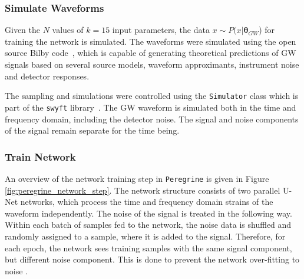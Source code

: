 \subsubsection{Simulate Waveforms}
\label{sec:method_peregine_simulate}
Given the $N$ values of $k=15$ input parameters, the data $x \sim P(x|\boldsymbol{\theta}_{GW}$) for training the network is simulated. The waveforms were simulated using the open source Bilby code~\cite{Ashton_Bilby_2019}, which is capable of generating theoretical predictions of GW signals based on several source models, waveform approximants, instrument noise and detector responses.

The sampling and simulations were controlled using the \texttt{Simulator} class which is part of the \texttt{swyft} library~\cite{Miller2022}. The GW waveform is simulated both in the time and frequency domain, including the detector noise. The signal and noise components of the signal remain separate for the time being.

\subsubsection{Train Network}

An overview of the network training step in \texttt{Peregrine} is given in Figure \ref{fig:peregrine_network_step}. The network structure consists of two parallel U-Net networks, which process the time and frequency domain strains of the waveform independently. The noise of the signal is treated in the following way. Within each batch of samples fed to the network, the noise data is shuffled and randomly assigned to a sample, where it is added to the signal. Therefore, for each epoch, the network sees training samples with the same signal component, but different noise component. This is done to prevent the network over-fitting to noise \cite{bhardwaj2023peregrine}.


